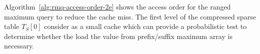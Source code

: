 Algorithm~\ref{alg:rmq-access-order-2e} shows the access order for the
ranged maximum query to reduce the cache miss.  The first level of the
compressed sparse table $T_S[0]$ consider as a small cache which can
provide a probabilistic test to determine whether the load the value
from prefix/suffix maximum array is necessary.



